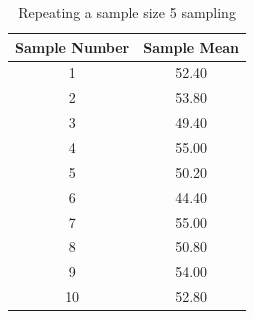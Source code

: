 \begin{table}[ht]
	\centering
	\caption{Repeating a sample size 5 sampling}
	\begin{tabular}{cc}
		\hline
		Sample Number & Sample Mean \\
		\hline
		1             & 52.40       \\
		2             & 53.80       \\
		3             & 49.40       \\
		4             & 55.00       \\
		5             & 50.20       \\
		6             & 44.40       \\
		7             & 55.00       \\
		8             & 50.80       \\
		9             & 54.00       \\
		10            & 52.80       \\
		\hline
	\end{tabular}
	\label{tbl::16_02}
\end{table}
